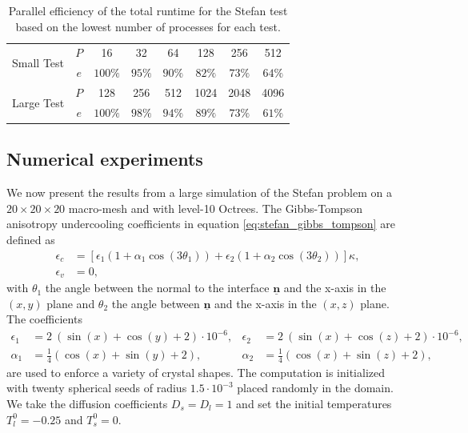 \begin{table}
\centering
	\begin{tabular}{|l|c|cccccc|}
	\hline
	\multirow{2}{*}{Small Test} & $P$ & 16      & 32      & 64      & 128     & 256    & 512 \\ 	                            
	                            & $e$ & $100\%$ & $95\%$  & $90\%$  & $82\%$  & $73\%$ & $64\%$ \\
	\hline
	\multirow{2}{*}{Large Test} & $P$ & 128     & 256     & 512     & 1024    & 2048   & 4096 \\ 	                            
	                            & $e$ & $100\%$ & $98\%$  & $94\%$  & $89\%$  & $73\%$ & $61\%$ \\
	\hline
	\end{tabular}
	\caption{Parallel efficiency of the total runtime for the Stefan test based on the lowest number of processes for each test. }
	\label{tab:scaling_stefan} 
\end{table}

\subsection{Numerical experiments}
We now present the results from a large simulation of the Stefan problem on a $20\times20\times20$ macro-mesh and with level-10 Octrees. The Gibbs-Tompson anisotropy undercooling coefficients in equation \eqref{eq:stefan_gibbs_tompson} are defined as
\begin{align*}
\epsilon_c & = \left[ \epsilon_1 \left( 1+\alpha_1 \cos(3\theta_1) \right) + \epsilon_2 \left( 1+\alpha_2 \cos(3\theta_2) \right) \right] \kappa,\\
\epsilon_v & = 0,
\end{align*}
with $\theta_1$ the angle between the normal to the interface $\underline{\mathbf{n}}$ and the x-axis in the $(x,y)$ plane and $\theta_2$ the angle between $\underline{\mathbf{n}}$ and the x-axis in the $(x,z)$ plane. The coefficients
\begin{align*}
\epsilon_1 & = 2~(\sin(x)+\cos(y)+2)\cdot10^{-6}, & \epsilon_2 & = 2~(\sin(x)+\cos(z)+2)\cdot10^{-6}, \\
\alpha_1 & = \frac{1}{4}(\cos(x)+\sin(y)+2), & \alpha_2 & = \frac{1}{4}(\cos(x)+\sin(z)+2),
\end{align*}
are used to enforce a variety of crystal shapes. The computation is initialized with twenty spherical seeds of radius $1.5 \cdot 10^{-3}$ placed randomly in the domain. We take the diffusion coefficients $D_s=D_l=1$ and set the initial temperatures $T^0_l=-0.25$ and $T^0_s=0$.

